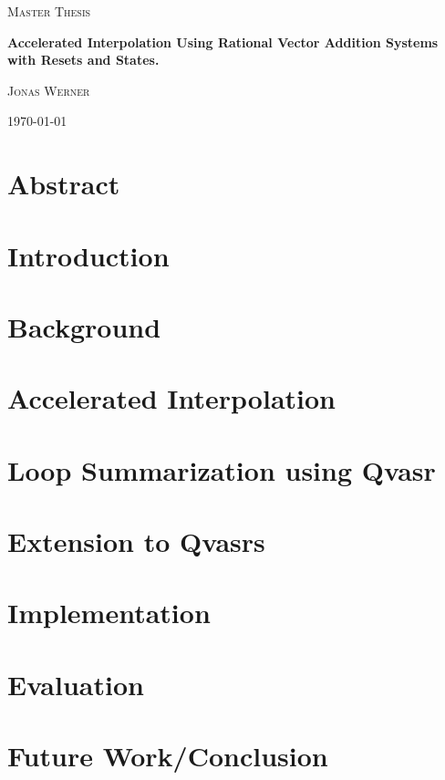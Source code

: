 \documentclass[11pt]{article}
\begin{document}
\newcommand{\HorizontalLine}{\rule{\linewidth}{0.3mm}}


\begin{center}
	{\scshape\Large Master Thesis \par}
	\vspace{1.5cm}
	{\huge\bfseries Accelerated Interpolation Using Rational Vector Addition Systems with Resets and States. \par}

	\vspace{1cm}
	{\large \scshape Jonas Werner\par}
	\vspace{0.5cm}
	{\today \vspace{2cm}}
\end{center}

\section*{Abstract}

\section*{Introduction}

\section*{Background}


\section*{Accelerated Interpolation}


\section*{Loop Summarization using Qvasr}


\section*{Extension to Qvasrs}


\section*{Implementation}


\section*{Evaluation}


\section*{Future Work/Conclusion}



\pagebreak
{}


\end{document}
